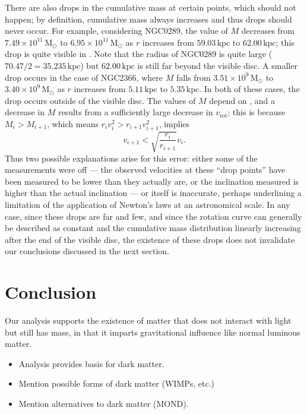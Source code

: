 \documentclass{article}
\newcommand\solmass{\textrm{M}_\odot}
\newcommand\kpc{\textrm{kpc}}
\newcommand\vrot{\ensuremath{v_{\textrm{rot}}}}
\begin{document}
There are also drops in the cumulative mass at certain points, which should not happen; by definition, cumulative mass always increases and thus drops should never occur.
For example, considering NGC0289, the value of \(M\) decreases from \(7.49\times 10^{11}\,\solmass\) to \(6.95\times 10^{11}\,\solmass\) as \(r\) increases from \(59.03\,\kpc\) to \(62.00\,\kpc\); this drop is quite visible in .
Note that the radius of NGC0289 is quite large (\(70.47/2 = 35.235\,\kpc\)) but \(62.00\,\kpc\) is still far beyond the visible disc.
A smaller drop occurs in the case of NGC2366, where \(M\) falls from \(3.51\times 10^9\,\solmass\) to \(3.40\times 10^9\,\solmass\) as \(r\) increases from \(5.11\,\kpc\) to \(5.35\,\kpc\).
In both of these cases, the drop occurs outside of the visible disc.
The values of \(M\) depend on , and a decrease in \(M\) results from a sufficiently large decrease in \(\vrot\); this is because \(M_i > M_{i+1}\), which means \(r_iv_i^2 > r_{i+1}v_{i+1}^2\), implies
\begin{equation}
    v_{i+1} < \sqrt{\frac{r_i}{r_{i+1}}}v_i.
\end{equation}
Thus two possible explanations arise for this error: either some of the measurements were off --- the observed velocities at these ``drop points'' have been measured to be lower than they actually are, or the inclination measured is higher than the actual inclination --- or  itself is inaccurate, perhaps underlining a limitation of the application of Newton's laws at an astronomical scale.
In any case, since these drops are far and few, and since the rotation curve can generally be described as constant and the cumulative mass distribution linearly increasing after the end of the visible disc, the existence of these drops does not invalidate our conclusions discussed in the next section.

\section{Conclusion}\label{sec:conclusion}

Our analysis supports the existence of matter that does not interact with light but still has mass, in that it imparts gravitational influence like normal luminous matter.

\begin{itemize}
    \item Analysis provides basis for dark matter.
    \item Mention possible forms of dark matter (WIMPs, etc.)
    \item Mention alternatives to dark matter (MOND).
\end{itemize}
\end{document}
